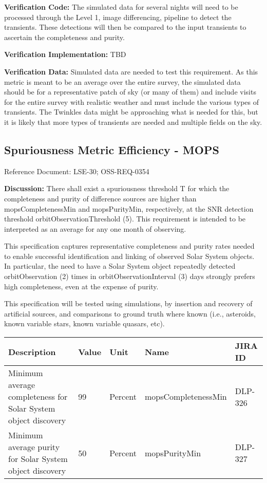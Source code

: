 \textbf{Verification Code:} The simulated data for several nights will
need to be processed through the Level 1, image differencing, pipeline
to detect the transients. These detections will then be compared to the
input transients to ascertain the completeness and purity.

\textbf{Verification Implementation:} TBD

\textbf{Verification Data:} Simulated data are needed to test this
requirement. As this metric is meant to be an average over the entire
survey, the simulated data should be for a representative patch of sky
(or many of them) and include visits for the entire survey with
realistic weather and must include the various types of transients. The
Twinkles data might be approaching what is needed for this, but it is
likely that more types of transients are needed and multiple fields on
the sky.

\subsection{Spuriousness Metric Efficiency -
MOPS}\label{spuriousness-metric-efficiency---mops}

Reference Document: LSE-30; OSS-REQ-0354

\textbf{Discussion:} There shall exist a spuriousness threshold T for
which the completeness and purity of difference sources are higher than
mopsCompletenessMin and mopsPurityMin, respectively, at the SNR
detection threshold orbitObservationThreshold (5). This requirement is
intended to be interpreted as an average for any one month of observing.

This specification captures representative completeness and purity rates
needed to enable successful identification and linking of observed Solar
System objects. In particular, the need to have a Solar System object
repeatedly detected orbitObservation (2) times in
orbitObservationInterval (3) days strongly prefers high completeness,
even at the expense of purity.

This specification will be tested using simulations, by insertion and
recovery of artificial sources, and comparisons to ground truth where
known (i.e., asteroids, known variable stars, known variable quasars,
etc).

\begin{longtable}[]{@{}lllll@{}}
\toprule
Description & Value & Unit & Name & JIRA ID\tabularnewline
\midrule
\endhead
Minimum average completeness for Solar System object discovery & 99 &
Percent & mopsCompletenessMin & DLP-326\tabularnewline
Minimum average purity for Solar System object discovery & 50 & Percent
& mopsPurityMin & DLP-327\tabularnewline
\bottomrule
\end{longtable}

